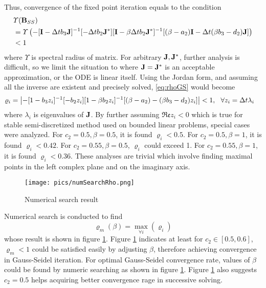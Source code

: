 \documentclass[preprint,12pt]{elsarticle}
\begin{document}
Thus, convergence of the fixed point iteration equals to
the condition
\begin{equation}
    \label{eq:rhoGS}
    \begin{aligned}
         & \varUpsilon(\mathbf{B}_{SS}) \\
         & =\varUpsilon\left(
        -[\mathbf{I} - \mathrm\Delta t b_3\mathbf{J}]^{-1}
        [- \mathrm\Delta t b_2\mathbf{J}^*]
        [\mathbf{I} - \beta\mathrm\Delta t b_2\mathbf{J}^*]^{-1}
        [(\beta-a_2)\mathbf{I} - \mathrm\Delta t (\beta b_3 - d_2)\mathbf{J}]
        \right)                         \\
         & < 1
    \end{aligned}
\end{equation}
where $\varUpsilon$ is spectral radius of matrix.
For arbitrary $\mathbf{J},\mathbf{J}^*$, further analysis is difficult,
so we limit the situation to where $\mathbf{J} = \mathbf{J}^*$ is an acceptable
approximation, or the ODE is linear itself.
Using the Jordan form,
and assuming all the inverse are existent and precisely solved,
\eqref{eq:rhoGS} would become
\begin{equation}
    \label{eq:rhoGS1}
    \begin{aligned}
        \varrho_i =
        \left|
        -[1 -  b_3z_i]^{-1}
        [- b_2z_i]
        [1 - \beta b_2z_i]^{-1}
        [(\beta-a_2) - (\beta b_3 - d_2)z_i]
        \right| & < 1,\ \ \forall z_i = \mathrm\Delta t \lambda_i
    \end{aligned}
\end{equation}
where $\lambda_i$ is eigenvalues of $\mathbf{J}$.
By further assuming $\mathfrak{Re} z_i < 0$
which is true for stable semi-discretized
method used on bounded linear problems,
special cases were analyzed.
For $c_2=0.5, \beta=0.5$, it is found
$\varrho_i < 0.5$.
For $c_2=0.5, \beta=1$, it is found $\varrho_i < 0.42$.
For $c_2=0.55, \beta=0.5$, $\varrho_i$ could exceed 1.
For $c_2=0.55, \beta=1$, it is found $\varrho_i < 0.36$.
These analyses are trivial which involve finding maximal points
in the left complex plane and on the imaginary axis.

\begin{figure}[htbp]
    \centering
    \texttt{[image: pics/numSearchRho.png]}
    \caption{Numerical search result }
    \label{fig:numSearchRho}
\end{figure}

Numerical search is conducted to find
\begin{equation}
    \varrho_m(\beta) = \max_{\forall i}(\varrho_i)
\end{equation}
whose result is shown in figure \ref{fig:numSearchRho}.
Figure \ref{fig:numSearchRho} indicates
at least for $c_2\in[0.5,0.6]$, $\varrho_m<1$
could be satisfied easily by adjusting $\beta$, therefore
achieving convergence in Gauss-Seidel iteration.
For optimal Gauss-Seidel convergence rate,
values of $\beta$ could be found by numeric searching
as shown in figure \ref{fig:numSearchRho}.
Figure \ref{fig:numSearchRho} also suggests
$c_2=0.5$ helps acquiring better convergence rage
in successive solving.
\end{document}
